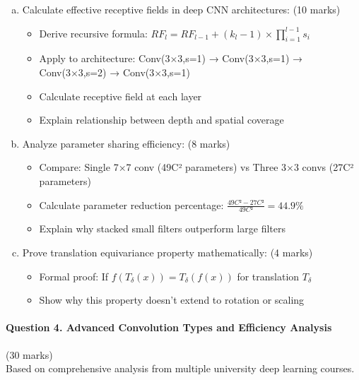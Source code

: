 \documentclass[12pt]{article}
\newcommand{\shortanswer}{\vspace{2cm}}
\newcommand{\mediumanswer}{\vspace{3cm}}
\newcommand{\journalspace}{\vspace{4.5cm}}
\begin{document}
\begin{enumerate}[(a)]
    \item Calculate effective receptive fields in deep CNN architectures: \hfill (10 marks)
    \begin{itemize}
        \item Derive recursive formula: $RF_l = RF_{l-1} + (k_l - 1) \times \prod_{i=1}^{l-1} s_i$
        \item Apply to architecture: Conv(3×3,s=1) → Conv(3×3,s=1) → Conv(3×3,s=2) → Conv(3×3,s=1)
        \item Calculate receptive field at each layer
        \item Explain relationship between depth and spatial coverage
    \end{itemize}
    
    \journalspace
    
    \item Analyze parameter sharing efficiency: \hfill (8 marks)
    \begin{itemize}
        \item Compare: Single 7×7 conv (49C² parameters) vs Three 3×3 convs (27C² parameters)  
        \item Calculate parameter reduction percentage: $\frac{49C² - 27C²}{49C²} = 44.9\%$
        \item Explain why stacked small filters outperform large filters
    \end{itemize}
    
    \mediumanswer
    
    \item Prove translation equivariance property mathematically: \hfill (4 marks)
    \begin{itemize}
        \item Formal proof: If $f(T_\delta(x)) = T_\delta(f(x))$ for translation $T_\delta$
        \item Show why this property doesn't extend to rotation or scaling
    \end{itemize}
    
    \shortanswer
\end{enumerate}

\newpage
\paragraph{Question 4. Advanced Convolution Types and Efficiency Analysis}{{\hfill (30 marks)}}\\
Based on comprehensive analysis from multiple university deep learning courses.
\end{document}
